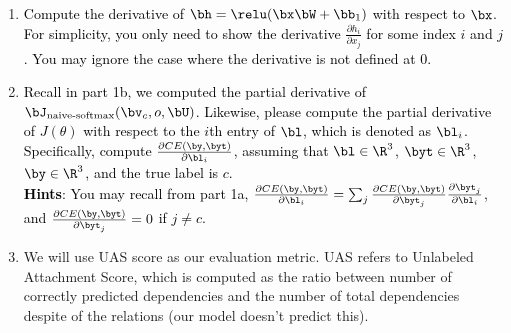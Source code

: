 \begin{parts}
\begin{enumerate}[label=\roman*.]
        \item \textcolor{black}{Compute the derivative of $\bh = \relu(\bx \bW + \bb_1)$ with respect to $\bx$. For simplicity, you only need to show the derivative $\frac{\partial h_i}{\partial x_j}$ for some index $i$ and $j$. You may ignore the case where the derivative is not defined at 0.}
        \item \textcolor{black}{Recall in part 1b, we computed the partial derivative of $\bJ_{\text{naive-softmax}}(\bv_c, o, \bU)$. Likewise, please compute the partial derivative of $J(\theta)$ with respect to the $i$th entry of $\bl$, which is denoted as $\bl_i$. Specifically, compute $\frac{\partial CE(\by, \byt)}{\partial \bl_i}$, assuming that $\bl \in \R^3$, $\byt \in \R^3$, $\by \in \R^3$, and the true label is $c$. \\
        \textbf{Hints}: You may recall from part 1a, $\frac{\partial CE(\by, \byt)}{\partial \bl_i} = \sum_j \frac{\partial CE(\by, \byt)}{\partial \byt_j}\frac{\partial \byt_j}{\partial \bl_i}$, and $\frac{\partial CE(\by, \byt)}{\partial \byt_j}=0$ if $j \neq c$. 
        }
        \item We will use UAS score as our evaluation metric. UAS refers to Unlabeled Attachment Score, which is computed as the ratio between number of correctly predicted dependencies and the number of total dependencies despite of the relations (our model doesn't predict this).\newline
    

\end{enumerate}
\end{parts}
